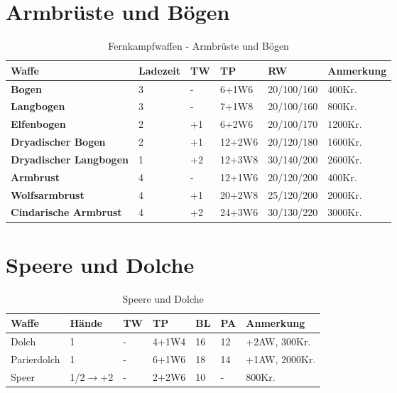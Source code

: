 \newpage
\section{Armbrüste und Bögen}
\begin{table}[h]
\begin{center}
\begin{tabular}{|l|l|l|l|l|l|}
\hline
\textbf{Waffe} & \textbf{Ladezeit} & \textbf{TW} & \textbf{TP} & \textbf{RW} & \textbf{Anmerkung} \\

\hline
\textbf{Bogen} & 3 & - & 6+1W6 & 20/100/160 & 400Kr. \\

\hline
\textbf{Langbogen} & 3 & - & 7+1W8 & 20/100/160 & 800Kr. \\

\hline
\textbf{Elfenbogen} & 2 & +1 & 6+2W6 & 20/100/170 & 1200Kr. \\

\hline
\textbf{Dryadischer Bogen} & 2 & +1 & 12+2W6 & 20/120/180 & 1600Kr. \\

\hline
\textbf{Dryadischer Langbogen} & 1 & +2 & 12+3W8 & 30/140/200 & 2600Kr. \\

\hline
\textbf{Armbrust} & 4 & - & 12+1W6 & 20/120/200 & 400Kr.  \\

\hline
\textbf{Wolfsarmbrust} & 4 & +1 & 20+2W8 & 25/120/200 & 2000Kr.  \\

\hline
\textbf{Cindarische Armbrust} & 4 & +2 & 24+3W6 & 30/130/220 & 3000Kr. \\

\hline
\end{tabular}
\end{center}
\caption{Fernkampfwaffen - Armbrüste und Bögen}
\label{tab:Fernkampfwaffen}
\end{table}


\section{Speere und Dolche}
\begin{table}[h]
\begin{center}
\begin{tabular}{|l|l|l|l|l|l|p{2.5cm}|}
\hline
\textbf{Waffe} & \textbf{Hände} & \textbf{TW} & \textbf{TP} & \textbf{BL} & \textbf{PA} & \textbf{Anmerkung} \\

\hline
Dolch & 1 & - & 4+1W4 & 16 & 12 & +2AW, 300Kr. \\

\hline
Parierdolch & 1 & - & 6+1W6 & 18 & 14 & +1AW, 2000Kr. \\

\hline
Speer & 1/2$\rightarrow$+2 & - & 2+2W6 & 10 & - & 800Kr. \\

\hline
\end{tabular}
\end{center}
\caption{Speere und Dolche}
\label{tab:SpeereUndDolche}
\end{table}


